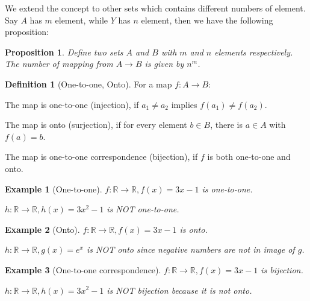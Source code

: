 \documentclass{article}
\theoremstyle{MyNonumberplain}
\theoremstyle{break}
\newcommand{\R}{\mathbb{R}}
\theoremstyle{break}
\newtheorem{proposition}{Proposition}[section]
\newtheorem{example}{Example}[section]
\theoremstyle{break}
\theoremstyle{definition}
\theoremstyle{break}
\newtheorem{definition}{Definition}[section]
\begin{document}
We extend the concept to other sets which contains different numbers of element. Say $A$ has $m$ element, while $Y$ has $n$ element, then we have the following proposition:
\begin{thmbox}
    \begin{proposition}
        Define two sets $A$ and $B$ with $m$ and $n$ elements respectively. The number of mapping from $A\to B$ is given by $n^m$.
    \end{proposition}
\end{thmbox}

\begin{defbox}
    \begin{definition}[One-to-one, Onto]
       For a map $f:A\to B$:\bigskip

       The map is one-to-one (injection), if $a_1\neq a_2$ implies $f(a_1)\neq f(a_2)$.\bigskip

       The map is onto (surjection), if for every element $b\in B$, there is $a\in A$ with $f(a)=b$. \bigskip

       The map is one-to-one correspondence (bijection), if $f$ is both one-to-one and onto.
    \end{definition}
\end{defbox}

\begin{expbox}
    \begin{example}[One-to-one]
        $f:\R\to\R, f(x)=3x-1$ is one-to-one.\bigskip

        $h:\R\to\R, h(x)=3x^2-1$ is NOT one-to-one.
    \end{example}
\end{expbox}

\begin{expbox}
    \begin{example}[Onto]
        $f:\R\to\R, f(x)=3x-1$ is onto.\bigskip

        $h:\R\to\R, g(x)=e^x$ is NOT onto since negative numbers are not in image of $g$.
    \end{example}
\end{expbox}

\begin{expbox}
    \begin{example}[One-to-one correspondence]
        $f:\R\to\R, f(x)=3x-1$ is bijection.\bigskip

        $h:\R\to\R, h(x)=3x^2-1$ is NOT bijection because it is not onto.
    \end{example}
\end{expbox}
\end{document}
